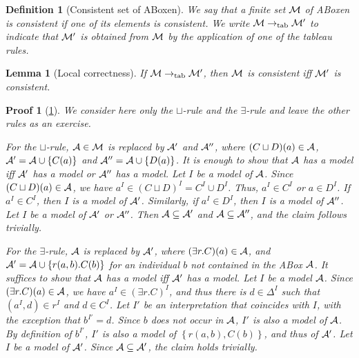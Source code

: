 \documentclass[openany]{scrbook}
\theoremstyle{break}
\newtheorem{Lemma}[Theorem]{Lemma}
\newtheorem{Definition}[Theorem]{Definition}
\theoremstyle{nonumberbreak}
\theoremstyle{nonumberplain}
\theoremstyle{nonumberbreak}
\newtheorem{Proof}{Proof}
\newcommand{\set}[1]{\left\{#1\right\}}
\newcommand{\totab}{\to_{\operatorname{tab}}}
\begin{document}
\begin{Definition}[Consistent set of ABoxen]
  We say that a finite set ${\cal M}$ of ABoxen is consistent if one
  of its elements is consistent. We write ${\cal M} \totab {\cal M}'$
  to indicate that ${\cal M}'$ is obtained from ${\cal M}$ by the
  application of one of the tableau rules.
\end{Definition}

\begin{Lemma}[Local correctness]
  \label{4.1}
  If ${\cal M} \totab {\cal M}'$, then ${\cal M}$ is consistent iff
  ${\cal M}'$ is consistent.
\end{Lemma}

\begin{Proof}[\cref{4.1}]
  We consider here only the $\sqcup$-rule and the $\exists$-rule and
  leave the other rules as an exercise.

  For the $\sqcup$-rule, ${\cal A} \in {\cal M}$ is replaced by ${\cal
    A}'$ and ${\cal A}''$, where $(C \sqcup D)(a) \in {\cal A}$,
  ${\cal A}' = {\cal A} \cup \set{C(a)}$ and ${\cal A}'' = {\cal A}
  \cup \set{D(a)}$. It is enough to show that ${\cal A}$ has a model
  iff ${\cal A}'$ has a model or ${\cal A}''$ has a model. Let $I$ be
  a model of ${\cal A}$. Since $(C \sqcup D)(a) \in {\cal A}$, we have
  $a^I \in (C \sqcup D)^I = C^I \cup D^I$. Thus, $a^I \in C^I$ or $a
  \in D^I$. If $a^I \in C^I$, then $I$ is a model of ${\cal
    A}'$. Similarly, if $a^I \in D^I$, then $I$ is a model of ${\cal
    A}''$. Let $I$ be a model of ${\cal A}'$ or ${\cal A}''$. Then
  ${\cal A} \subseteq {\cal A}'$ and ${\cal A} \subseteq {\cal A}''$,
  and the claim follows trivially.

  For the $\exists$-rule, ${\cal A}$ is replaced by ${\cal A}'$, where
  $(\exists r.C)(a) \in {\cal A}$, and ${\cal A}' = {\cal A} \cup
  \set{r(a, b).C(b)}$ for an individual $b$ not contained in the ABox
  ${\cal A}$. It suffices to show that ${\cal A}$ has a model iff
  ${\cal A}'$ has a model. Let $I$ be a model ${\cal A}$. Since
  $(\exists r.C)(a) \in {\cal A}$, we have $a^I \in (\exists r.C)^I$,
  and thus there is $d \in \Delta^I$ such that $(a^I, d) \in r^I$ and
  $d \in C^I$. Let $I'$ be an interpretation that coincides with $I$,
  with the exception that $b^{I'} = d$. Since $b$ does not occur in
  ${\cal A}$, $I'$ is also a model of ${\cal A}$. By definition of
  $b^{I'}$, $I'$ is also a model of $\set{r(a, b), C(b)}$, and thus of
  ${\cal A}'$. Let $I$ be a model of ${\cal A}'$. Since ${\cal A} \subseteq
  {\cal A}'$, the claim holds trivially.
\end{Proof}
\end{document}

